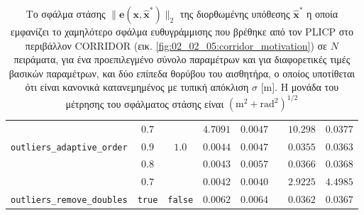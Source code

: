 \begin{table*}
\begin{tabular}{lccrrrrr}
                                      & $0.7$           &                 & $4.7091$        & $0.0047$        &  & $10.298$         & $0.0377$   \\
  \texttt{outliers\_adaptive\_order}  & $0.9$           & $1.0$           & $0.0044$        & $0.0047$        &  & $0.0355$         & $0.0363$   \\
                                      & $0.8$           &                 & $0.0043$        & $0.0057$        &  & $0.0366$         & $0.0368$   \\
                                      & $0.7$           &                 & $0.0042$        & $0.0040$        &  & $2.9225$         & $4.4985$   \\
  \texttt{outliers\_remove\_doubles}  & \texttt{true}   & \texttt{false}  & $0.0062$        & $0.0064$        &  & $0.0362$         & $0.0367$   \\ \bottomrule
\end{tabular}
  \caption{\small Το σφάλμα στάσης $\|\bm{e}(\bm{x},\hat{\bm{x}}^\ast)\|_2$ της
           διορθωμένης υπόθεσης $\hat{\bm{x}}^\ast$ η οποία εμφανίζει το
           χαμηλότερο σφάλμα ευθυγράμμισης που βρέθηκε από τον PLICP στο
           περιβάλλον CORRIDOR (εικ.  \ref{fig:02_02_05:corridor_motivation})
           σε $N$ πειράματα, για ένα προεπιλεγμένο σύνολο παραμέτρων και για
           διαφορετικές τιμές βασικών παραμέτρων, και δύο επίπεδα θορύβου του
           αισθητήρα, ο οποίος υποτίθεται ότι είναι κανονικά κατανεμημένος με
           τυπική απόκλιση $\sigma$ [m]. Η μονάδα του μέτρησης του σφάλματος
           στάσης είναι $(\text{m}^2+\text{rad}^2)^{1/2}$}
\label{tbl:csm_diff_params}
\end{table*}


